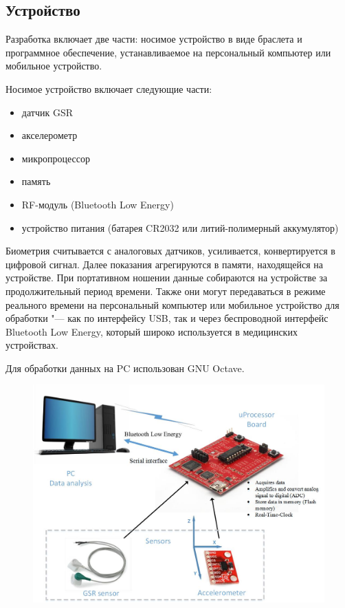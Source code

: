 \documentclass[10pt, a5paper]{article}
\begin{document}
\subsection*{Устройство}

Разработка включает две части: носимое устройство в виде браслета и программное обеспечение, устанавливаемое на персональный компьютер или мобильное устройство.

Носимое устройство включает следующие части:

\begin{itemize}
  \item датчик GSR
  \item акселерометр
  \item микропроцессор
  \item память
  \item RF-модуль (Bluetooth Low Energy)
  \item устройство питания (батарея CR2032 или литий-полимерный аккумулятор)
\end{itemize}

Биометрия считывается с аналоговых датчиков, усиливается, конвертируется в цифровой сигнал. Далее показания агрегируются в памяти, находящейся на устройстве. При портативном ношении данные собираются на устройстве за продолжительный период времени. Также они могут передаваться в режиме реального времени на персональный компьютер или мобильное устройство для обработки "--- как по интерфейсу USB, так и через беспроводной интерфейс Bluetooth Low Energy, который широко используется в медицинских устройствах.

Для обработки данных на PC использован GNU Octave.

\begin{figure}[h!]
  \centering
  \includegraphics[width=\textwidth]{107_2014_w_Karabutova_struct.png}
\end{figure}
\end{document}
